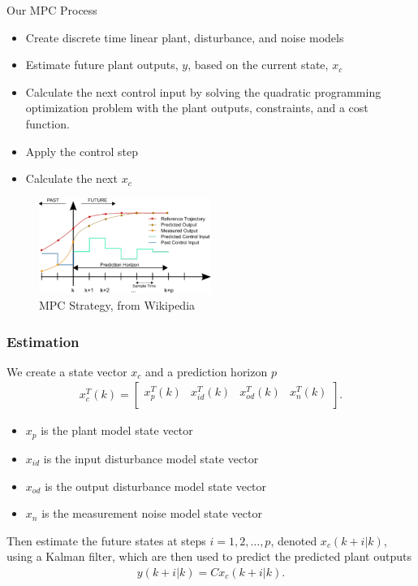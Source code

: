 \documentclass[aspectratio=169]{beamer}
\begin{document}
\begin{frame}{Our MPC Process}
    \begin{itemize}
        \item Create discrete time linear plant, disturbance, and noise models
        \item Estimate future plant outputs, $y$, based on the current state, $x_c$
        \item Calculate the next control input by solving the quadratic programming optimization
            problem with the plant outputs, constraints, and a cost function.
        \item Apply the control step
        \item Calculate the next $x_c$
    \end{itemize}
    \begin{figure}
        \centering
        \includegraphics[width=0.5\textwidth]{MPC_scheme_basic.pdf}
        \caption{MPC Strategy, from Wikipedia}
    \end{figure}
\end{frame}

\begin{frame}[t]
    \frametitle{Estimation}
    We create a state vector $x_{c}$ and a prediction horizon $p$
    \begin{align*}
        x_c^{T}(k) = 
\begin{bmatrix}
    x_p^{T}(k) & x^{T}_{id}(k) & x^{T}_{od}(k) & x^{T}_{n}(k) \\
\end{bmatrix}
    .\end{align*}
    \begin{itemize}
        \item $x_p$ is the plant model state vector
        \item $x_{id}$ is the input disturbance model state vector
        \item $x_{od}$ is the output disturbance model state vector
        \item $x_{n}$ is the measurement noise model state vector
    \end{itemize}
    Then estimate the future states at steps $i=1, 2, \ldots, p$, denoted $x_c\left( k+i|k \right)$, using a Kalman filter,
    which are then used to predict the predicted plant outputs 
    \begin{align*}
        y\left( k+i|k \right) = C x_c\left( k+i|k \right) 
    .\end{align*}
\end{frame}
\end{document}

